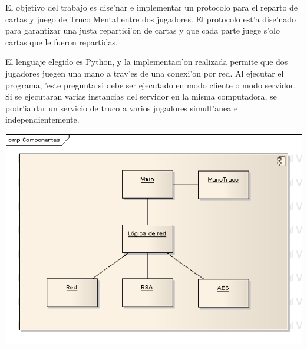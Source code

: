 El objetivo del trabajo es dise'nar e implementar un protocolo para el reparto de cartas y juego de Truco Mental entre dos jugadores.
El protocolo est'a dise'nado para garantizar una justa repartici'on de cartas y que cada parte juege s'olo cartas que le fueron repartidas.

El lenguaje elegido es Python, y la implementaci'on realizada permite que dos jugadores juegen una mano a trav'es de una conexi'on por red. Al ejecutar el programa, 'este pregunta si debe ser ejecutado en modo cliente o modo servidor. Si se ejecutaran varias instancias del servidor en la misma computadora, se podr'ia dar un servicio de truco a varios jugadores simult'anea e independientemente.

\includegraphics{Componentes.png}